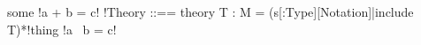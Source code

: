 \documentclass{article}
\begin{document}
some%
!a + b = c!%
!Theory ::== theory T : M = (s[:Type][Notation]|include T)*!thing%
!a \ b = c!
\end{document}
